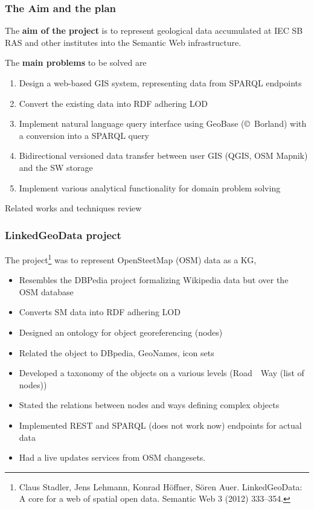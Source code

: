 \documentclass[10pt]{beamer}
\begin{document}
\begin{frame}
  \frametitle{The Aim and the plan}
  The \textbf{aim of the project} is to represent geological data accumulated at IEC SB RAS and other institutes into the Semantic Web infrastructure.

  The \textbf{main problems} to be solved are
  \begin{enumerate}
  \item Design a web-based GIS system, representing data from SPARQL endpoints
  \item Convert the existing data into RDF adhering LOD
  \item Implement natural language query interface using GeoBase (\copyright~Borland) with a conversion into a SPARQL query
  \item Bidirectional versioned data transfer between user GIS (QGIS, OSM Mapnik) and the SW storage %
  \item Implement various analytical functionality for domain problem solving
  \end{enumerate}
\end{frame}


\begin{frame}
  \centering
  \Large Related works and techniques review
\end{frame}


\begin{frame}
  \frametitle{\textbf{LinkedGeoData} project}
  The project\footnote{Claus Stadler, Jens Lehmann, Konrad Höffner, Sören Auer. LinkedGeoData:
A core for a web of spatial open data. Semantic Web 3 (2012) 333–354. } was to represent OpenSteetMap (OSM) data as a KG,
  \begin{itemize}
  \item Resembles the DBPedia project formalizing Wikipedia data but over the OSM database
  \item Converts SM data into RDF adhering LOD
  \item Designed an ontology for object georeferencing (nodes)
  \item Related the object to DBpedia, GeoNames, icon sets
  \item Developed a taxonomy of the objects on a various levels (Road~\to~Way (list of nodes)) %
  \item Stated the relations between nodes and ways defining complex objects
  \item Implemented REST and SPARQL (does not work now) endpoints for actual data
  \item Had a live updates services from OSM changesets.
  \end{itemize}
\end{frame}
\end{document}
